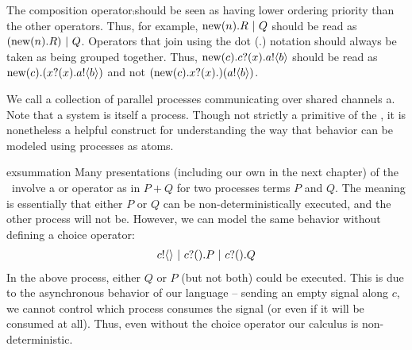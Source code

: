 	The composition operator$\comp$should be seen as having lower ordering priority than the other operators.  Thus, for example, $\text{new}({n}).R \ |\  Q$ should be read as $(\text{new}({n}).R) \ |\  Q$.  Operators that join using the dot (.) notation should always be taken as being grouped together.  Thus, $\text{new}({c}).{c}?({x}).{a}!\langle{b}\rangle$ should be read as $\text{new}({c}).({x}?({x}).{a}!\langle{b}\rangle)$ and not $(\text{new}({c}).{x}?({x}).)({a}!\langle{b}\rangle)$.
	
	We call a collection of parallel processes communicating over shared channels a\emph{}.  
Note that a system is itself a process.  
Though not strictly a primitive of the \picalc, it is nonetheless a helpful construct for understanding the way that behavior can be modeled using processes as atoms.
\begin{example}{exsummation}
	 Many presentations (including our own in the next chapter) of the \picalc\ involve a  or  operator as in $P+Q$ for two processes terms $P$ and $Q$.  
The meaning is essentially that either $P$ or $Q$ can be non-deterministically executed, and the other process will not be.  
However, we can model the same behavior without defining a choice operator:
	\begin{align}
		{c}!\langle{}\rangle \ |\  {c}?({}).P \ |\  {c}?({}).Q
	\end{align}
	In the above process, either $Q$ or $P$ (but not both) could be executed.  
This is due to the asynchronous behavior of our language -- sending an empty signal along $c$, we cannot control which process consumes the signal (or even if it will be consumed at all). 
Thus, even without the choice operator our calculus is non-deterministic.
\end{example}

